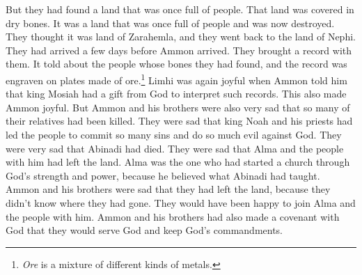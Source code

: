 But they had found a land that was once full of people. That land was covered in dry bones. It was a land that was once full of people and was now destroyed. They thought it was land of Zarahemla, and they went back to the land of Nephi. They had arrived a few days before Ammon arrived.
\bverse \iffalse And they brought a record with them, even a record of the people whose bones they had found; and it was engraven on plates of ore. \fi
They brought a record with them. It told about the people whose bones they had found, and the record was engraven on plates made of ore.\footnote{\textit{Ore} is a mixture of different kinds of metals.}
\bverse \iffalse And now Limhi was again filled with joy in learning from the mouth of Ammon that king Mosiah had a gift from God, whereby he could interpret such engravings; yea, and Ammon also did rejoice. \fi
Limhi was again joyful when Ammon told him that king Mosiah had a gift from God to interpret such records. This also made Ammon joyful.
\bverse \iffalse Yet Ammon and his brethren were filled with sorrow because so many of their brethren had been slain; \fi
But Ammon and his brothers were also very sad that so many of their relatives had been killed.
\bverse \iffalse And also that king Noah and his priests had caused the people to commit so many sins and iniquities against God; and they also did mourn for the death of Abinadi; and also for the departure of Alma and the people that went with him, who had formed a church of God through the strength and power of God, and faith on the words which had been spoken by Abinadi. \fi
They were sad that king Noah and his priests had led the people to commit so many sins and do so much evil against God. They were very sad that Abinadi had died. They were sad that Alma and the people with him had left the land. Alma was the one who had started a church through God's strength and power, because he believed what Abinadi had taught. 
\bverse \iffalse Yea, they did mourn for their departure, for they knew not whither they had fled. Now they would have gladly joined with them, for they themselves had entered into a covenant with God to serve him and keep his commandments. \fi
Ammon and his brothers were sad that they had left the land, because they didn't know where they had gone. They would have been happy to join Alma and the people with him. Ammon and his brothers had also made a covenant with God that they would serve God and keep God's commandments.
\bverse \iffalse And now since the coming of Ammon, king Limhi had also entered into a covenant with God, and also many of his people, to serve him and keep his commandments. \fi
